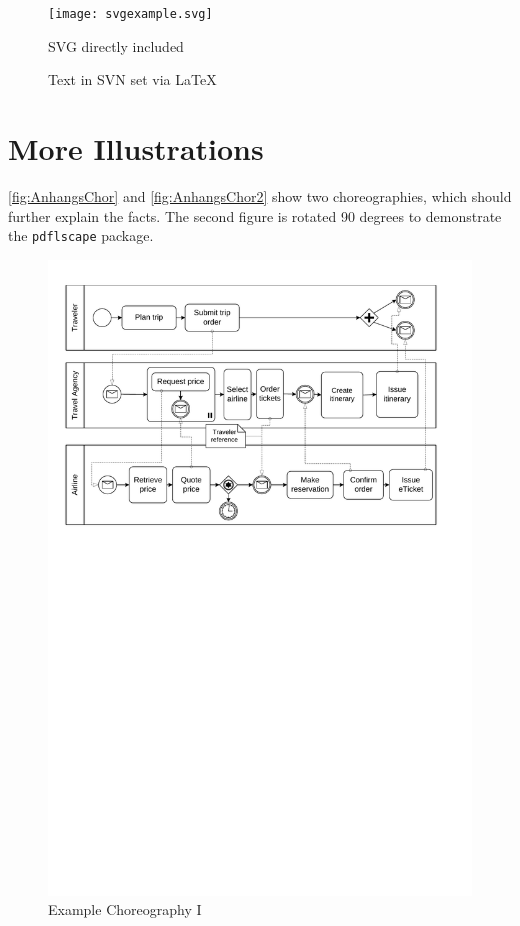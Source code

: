   \begin{figure}
    \centering
    \texttt{[image: svgexample.svg]}
    \caption{SVG directly included}
    \label{fig:directSVG}
  \end{figure}

  \begin{figure}
    \centering
    \def\svgwidth{.4\textwidth}
    
    \caption{Text in SVN set via \LaTeX{}}
    \label{fig:latexSVG}
  \end{figure}
\fi %



\section{More Illustrations}
\autoref{fig:AnhangsChor} and \ref{fig:AnhangsChor2} show two choreographies, which should further explain the facts. The second figure is rotated 90 degrees to demonstrate the \texttt{pdflscape} package.

\begin{figure}
  \centering
  \includegraphics[width=\textwidth]{figures/choreography.pdf}
  \caption{Example Choreography I}
  \label{fig:AnhangsChor}
\end{figure}

